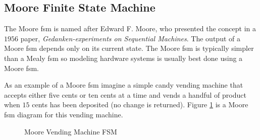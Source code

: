 \subsection{Moore Finite State Machine}
\label{SIM:subsec:moore_finite_state_machine}

The Moore \gls{fsm} is named after Edward F. Moore, who presented the concept in a $ 1956 $ paper, \emph{Gedanken-experiments on Sequential Machines}. The output of a Moore \gls{fsm} depends only on its current state. The Moore \gls{fsm} is typically simpler than a Mealy \gls{fsm} so modeling hardware systems is usually best done using a Moore \gls{fsm}. 

As an example of a Moore \gls{fsm} imagine a simple candy vending machine that accepts either five cents or ten cents at a time and vends a handful of product when $ 15 $ cents has been deposited (no change is returned). Figure \ref{SIM:fig:moore_vending_machine_fsm} is a Moore \gls{fsm} diagram for this vending machine.

\begin{figure}[H]
  \caption{Moore Vending Machine FSM}
  \label{SIM:fig:moore_vending_machine_fsm}
  \myfloatalign
\end{figure}

